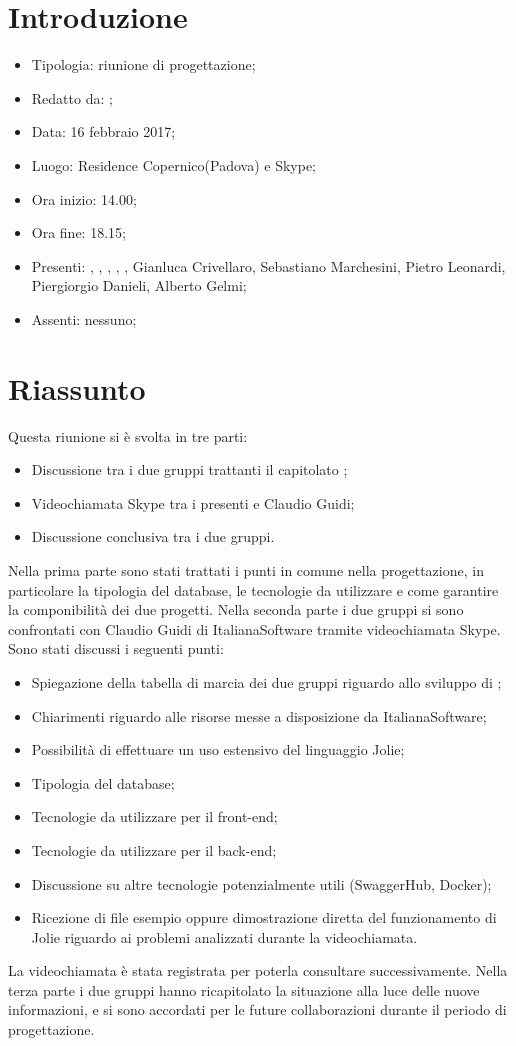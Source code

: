 \section{Introduzione}

	\begin{itemize}
		\item Tipologia: riunione di progettazione;
		\item Redatto da: \MC;
		\item Data: 16 febbraio 2017;
		\item Luogo: Residence Copernico(Padova) e Skype;
		\item Ora inizio: 14.00;
		\item Ora fine: 18.15;
		\item Presenti: \AN, \DAN, \DS, \MC, \NS, Gianluca Crivellaro, Sebastiano Marchesini, Pietro Leonardi, Piergiorgio Danieli, Alberto Gelmi;	
		\item Assenti: nessuno;
	\end{itemize}

\section{Riassunto}
Questa riunione si è svolta in tre parti:
\begin{itemize}
	\item Discussione tra i due gruppi trattanti il capitolato \progetto;
	\item Videochiamata Skype tra i presenti e Claudio Guidi;
	\item Discussione conclusiva tra i due gruppi.
\end{itemize}
Nella prima parte sono stati trattati i punti in comune nella progettazione, in particolare la tipologia del database, le tecnologie da utilizzare e come garantire la componibilità dei due progetti.
Nella seconda parte i due gruppi si sono confrontati con Claudio Guidi di ItalianaSoftware tramite videochiamata Skype. Sono stati discussi i seguenti punti:
\begin{itemize}
	\item Spiegazione della tabella di marcia dei due gruppi riguardo allo sviluppo di \progetto;
	\item Chiarimenti riguardo alle risorse messe a disposizione da ItalianaSoftware;
	\item Possibilità di effettuare un uso estensivo del linguaggio Jolie;
	\item Tipologia del database;
	\item Tecnologie da utilizzare per il front-end;
	\item Tecnologie da utilizzare per il back-end;
	\item Discussione su altre tecnologie potenzialmente utili (SwaggerHub, Docker);
	\item Ricezione di file esempio oppure dimostrazione diretta del funzionamento di Jolie riguardo ai problemi analizzati durante la videochiamata.
\end{itemize}
La videochiamata è stata registrata per poterla consultare successivamente.
Nella terza parte i due gruppi hanno ricapitolato la situazione alla luce delle nuove informazioni, e si sono accordati per le future collaborazioni durante il periodo di progettazione.